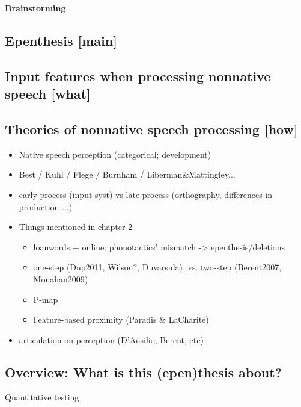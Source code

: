 \textbf{Brainstorming} \\


\subsection{Epenthesis [main]}

\subsection{}

\subsection{Input features when processing nonnative speech [what]}

\subsection{Theories of nonnative speech processing [how]}

\begin{itemize}
\item Native speech perception (categorical; development)
\item Best / Kuhl / Flege / Burnham / Liberman\&Mattingley...
\item early process (input syst) vs late process (orthography, differences in production ...)
\item Things mentioned in chapter 2
  \begin{itemize}
  \item loanwords + online: phonotactics' mismatch -> epenthesis/deletions
  \item one-step (Dup2011, Wilson?, Duvarsula), vs. two-step (Berent2007, Monahan2009)
  \item P-map
  \item Feature-based proximity (Paradis \& LaCharité)
  \end{itemize}
\item articulation on perception (D'Ausilio, Berent, etc)
\end{itemize}

\subsection{Overview: What is this (epen)thesis about?}

Quantitative testing $~$
